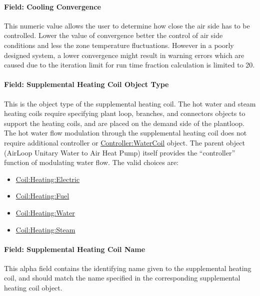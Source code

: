 \paragraph{Field: Cooling Convergence}\label{field-cooling-convergence}

This numeric value allows the user to determine how close the air side has to be controlled. Lower the value of convergence better the control of air side conditions and less the zone temperature fluctuations. However in a poorly designed system, a lower convergence might result in warning errors which are caused due to the iteration limit for run time fraction calculation is limited to 20.

\paragraph{Field: Supplemental Heating Coil Object Type}\label{field-supplemental-heating-coil-object-type-3}

This is the object type of the supplemental heating coil. The hot water and steam heating coils require specifying plant loop, branches, and connectors objects to support the heating coils, and are placed on the demand side of the plantloop. The hot water flow modulation through the supplemental heating coil does not require additional controller or \hyperref[controllerwatercoil]{Controller:WaterCoil} object. The parent object (AirLoop Unitary Water to Air Heat Pump) itself provides the ``controller'' function of modulating water flow. The valid choices are:

\begin{itemize}
\item
  \hyperref[coilheatingelectric]{Coil:Heating:Electric}
\item
  \hyperref[coilheatinggas-000]{Coil:Heating:Fuel}
\item
  \hyperref[coilheatingwater]{Coil:Heating:Water}
\item
  \hyperref[coilheatingsteam]{Coil:Heating:Steam}
\end{itemize}

\paragraph{Field: Supplemental Heating Coil Name}\label{field-supplemental-heating-coil-name-3}

This alpha field contains the identifying name given to the supplemental heating coil, and should match the name specified in the corresponding supplemental heating coil object.

